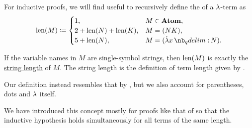 \begin{definition}\label{def:lambda_term_length}\mimprovised
  For inductive proofs, we will find useful to recursively define the  of a \( {\mathrm \lambda} \)-term as
  \begin{equation*}
    \len(M) \coloneqq \begin{cases}
      1,                     &M \in \op*{Atom}, \\
      2 + \len(N) + \len(K), &M = (NK), \\
      5 + \len(N),           &M = (\qabs x N). \\
    \end{cases}
  \end{equation*}
\end{definition}
\begin{comments}
  \item If the variable names in \( M \) are single-symbol strings, then \( \operatorname{len}(M) \) is exactly the \hyperref[def:formal_language/string_length]{string length} of \( M \). The string length is the definition of term length given by .

  Our definition instead resembles that by , but we also account for parentheses, dots and \( {\mathrm \lambda} \) itself.

  \item We have introduced this concept mostly for proofs like that of  so that the inductive hypothesis holds simultaneously for all terms of the same length.
\end{comments}

